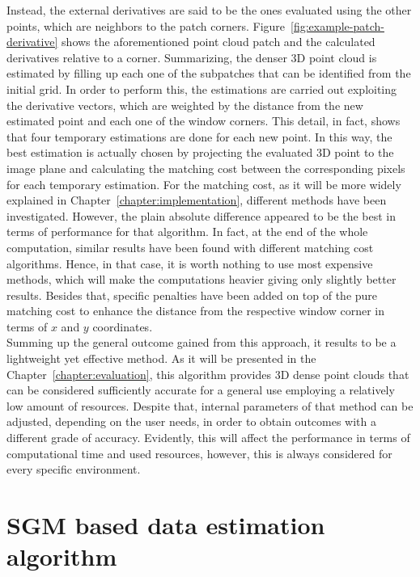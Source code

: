 Instead, the external derivatives are said to be the ones evaluated using the other points, which are neighbors to the patch corners. 
Figure~\ref{fig:example-patch-derivative} shows the aforementioned point cloud patch and the calculated derivatives relative to a corner. 
Summarizing, the denser 3D point cloud is estimated by filling up each one of the subpatches that can be identified from the initial grid. 
In order to perform this, the estimations are carried out exploiting the derivative vectors, which are weighted by the distance from the new estimated point and each one of the window corners.
This detail, in fact, shows that four temporary estimations are done for each new point. 
In this way, the best estimation is actually chosen by projecting the evaluated 3D point to the image plane and calculating the matching cost between the corresponding pixels for each temporary estimation.
For the matching cost, as it will be more widely explained in Chapter~\ref{chapter:implementation}, different methods have been investigated.
However, the plain absolute difference appeared to be the best in terms of performance for that algorithm.
In fact, at the end of the whole computation, similar results have been found with different matching cost algorithms.
Hence, in that case, it is worth nothing to use most expensive methods, which will make the computations heavier giving only slightly better results.
Besides that, specific penalties have been added on top of the pure matching cost to enhance the distance from the respective window corner in terms of $x$ and $y$ coordinates.\\
Summing up the general outcome gained from this approach, it results to be a lightweight yet effective method.
As it will be presented in the Chapter~\ref{chapter:evaluation}, this algorithm provides 3D dense point clouds that can be considered sufficiently accurate for a general use employing a relatively low amount of resources.
Despite that, internal parameters of that method can be adjusted, depending on the user needs, in order to obtain outcomes with a different grade of accuracy. 
Evidently, this will affect the performance in terms of computational time and used resources, however, this is always considered for every specific environment. 

\section{SGM based data estimation algorithm}
\label{section:sgm-based-algorithm}

